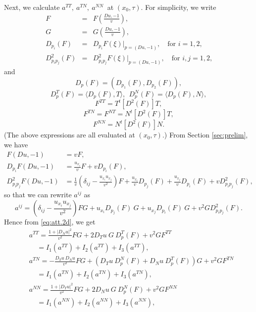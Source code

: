 \documentclass[12pt]{article}
\numberwithin{equation}{section}
\theoremstyle{plain}
\theoremstyle{definition}
\theoremstyle{remark}
\begin{document}
Next, we calculate $a^{TT},\ a^{TN},\ a^{NN}\ $ at $(x_0,\tau)$. 
For simplicity, 
we write
\begin{eqnarray*}
    F &=& F\left(\frac{Du,-1}{v}\right),\\
    G &=& G\left(\frac{Du,-1}{v}\right),\\
    D_{p_i}(F) &=& D_{p_i} F(\xi) \Bigg|_{p=(Du,-1)},\quad\text{for $i=1,2$,}\\
    D^2_{p_i p_j} (F) &=& D^2_{p_i p_j} F(\xi) \Bigg|_{p=(Du,-1)},\quad\text{for $i,j=1,2$,}
\end{eqnarray*}and 
\begin{equation*}
    D_p (F) = (D_{p_1}(F),D_{p_2}(F)),
\end{equation*}
\begin{equation*}
    D^T_p (F) = \langle D_p (F), T \rangle,\ \ D^N_p (F) = \langle D_p (F), N \rangle,
\end{equation*}
\begin{equation*}
    F^{TT}=T^t [D^2(F)]  T,   
\end{equation*}
\begin{equation*}
    F^{TN}=F^{NT}=N^t [D^2(F)]  T,
\end{equation*}
\begin{equation*}
    F^{NN}=N^t [D^2(F)]  N.
\end{equation*}
(The above expressions are all evaluated at $(x_0,\tau)$.)
From Section \ref{sec:prelim}, we have
\begin{equation} \label{eq:ang_F_sep}
\begin{split}
    F(Du,-1) &= v F, \\
    D_{p_i} F (Du,-1) &= \frac{u_{x_i}}{v} F + v D_{p_i} (F),\\
    D^2_{p_i p_j} F (Du,-1) &= \frac{1}{v} \left( \delta_{ij} - \frac{u_{x_i} u_{x_j}}{v^2} \right) F + \frac{u_{x_i}}{v} D_{p_j} (F) + \frac{u_{x_j}}{v} D_{p_i} (F) + v D^2_{p_i p_j} (F),
\end{split}
\end{equation}
so that we can rewrite $a^{ij}$ as
\begin{equation}
    a^{ij}= \left( \delta_{ij} - \frac{u_{x_i} u_{x_j}}{v^2} \right) F G + u_{x_i} D_{p_j} (F) \ G + u_{x_j} D_{p_i} (F) \ G + v^2 G D^2_{p_i p_j} (F).
\end{equation}
Hence from \eqref{eq:att.2d}, we get
\begin{equation} \label{eq:ang_aTN_sep}
\begin{split}
    & a^{TT}=\frac{1+|D_N u|^2}{v^2} F G + 2 D_T u\ G\ D^T_p (F) + v^2 G F^{TT} \\
    &\ \ \ \ \ =I_1(a^{TT}) + I_2(a^{TT}) + I_3(a^{TT}), \\
    & a^{TN}=-\frac{D_T u \ D_N u}{v^2} F G + \left( D_T u\ D^N_p (F) + D_N u\ D^T_p (F) \right) G + v^2 G F^{TN} \\
    &\ \ \ \ \ =I_1(a^{TN}) + I_2(a^{TN}) + I_3(a^{TN}), \\
    & a^{NN}=\frac{1+|D_T u|^2}{v^2} F G + 2 D_N u\ G\ D^N_p (F) + v^2 G F^{NN} \\
    &\ \ \ \ \ =I_1(a^{NN}) + I_2(a^{NN}) + I_3(a^{NN}),
\end{split}    
\end{equation}
\end{document}

